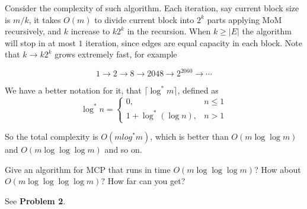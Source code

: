 \documentclass[11pt,a4paper,oneside]{article}
\begin{document}
\begin{problem}{2}
	Consider the complexity of such algorithm. Each iteration, say current block size is $m / k$, it takes $O(m)$ to divide current block into $2 ^ k$ parts applying MoM recursively, and $k$ increase to $k 2 ^ k$ in the recursion. When $k \geq |E|$ the algorithm will stop in at most $1$ iteration, since edges are equal capacity in each block. Note that $k \rightarrow k 2 ^ k$ grows extremely fast, for example

	$$ 1 \rightarrow 2 \rightarrow 8 \rightarrow 2048 \rightarrow 2 ^ {2060} \rightarrow \cdots$$
	
	We have a better notation for it, that \(\lceil \log^* m \rceil\), defined as $$
		\log ^ * n =
		\begin{cases}
			0, &n \leq 1 \\
			1 + \log^*(\log n), &n > 1
		\end{cases}
	$$
	
	So the total complexity is \(O(mlog^*m)\), which is better than \(O(m\log\log m)\) and \(O(m\log\log\log m)\) and so on.
	
\end{problem}
\begin{problem}{3}
	\statement
	Give an algorithm for MCP that runs in time $O(m \log \log \log m)$? How about $O(m \log \log \log \log m)$? How far can you get?
	
	\solution
	
	See \textbf{Problem 2}.

\end{problem}
\end{document}
